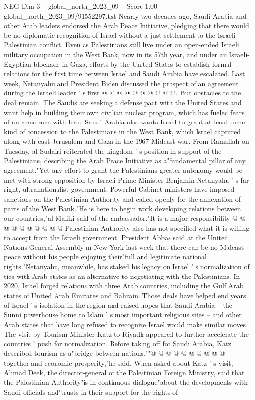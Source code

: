 \begin{textsample}{NEG Dim 3 – global\_north\_2023\_09 – Score 1.00 – global\_north\_2023\_09/91552297.txt}
Nearly two decades ago, Saudi Arabia and other Arab leaders endorsed the Arab Peace Initiative, pledging that there would be no diplomatic recognition of Israel without a just settlement to the Israeli-Palestinian conflict.
Even as Palestinians still live under an open-ended Israeli military occupation in the West Bank, now in its 57th year, and under an Israeli-Egyptian blockade in Gaza, efforts by the United States to establish formal relations for the first time between Israel and Saudi Arabia have escalated.
Last week, Netanyahu and President Biden discussed the prospect of an agreement during the Israeli leader ' s first @ @ @ @ @ @ @ @ @ @.
But obstacles to the deal remain.
The Saudis are seeking a defense pact with the United States and want help in building their own civilian nuclear program, which has fueled fears of an arms race with Iran.
Saudi Arabia also wants Israel to grant at least some kind of concession to the Palestinians in the West Bank, which Israel captured along with east Jerusalem and Gaza in the 1967 Mideast war.
From Ramallah on Tuesday, al-Sudairi reiterated the kingdom ' s position in support of the Palestinians, describing the Arab Peace Initiative as a"fundamental pillar of any agreement."Yet any effort to grant the Palestinians greater autonomy would be met with strong opposition by Israeli Prime Minister Benjamin Netanyahu ' s far-right, ultranationalist government.
Powerful Cabinet ministers have imposed sanctions on the Palestinian Authority and called openly for the annexation of parts of the West Bank."He is here to begin work developing relations between our countries,"al-Maliki said of the ambassador."It is a major responsibility @ @ @ @ @ @ @ @ @ @ Palestinian Authority also has not specified what it is willing to accept from the Israeli government.
President Abbas said at the United Nations General Assembly in New York last week that there can be no Mideast peace without his people enjoying their"full and legitimate national rights."Netanyahu, meanwhile, has staked his legacy on Israel ' s normalization of ties with Arab states as an alternative to negotiating with the Palestinians.
In 2020, Israel forged relations with three Arab countries, including the Gulf Arab states of United Arab Emirates and Bahrain.
Those deals have helped end years of Israel ' s isolation in the region and raised hopes that Saudi Arabia -- the Sunni powerhouse home to Islam ' s most important religious sites -- and other Arab states that have long refused to recognize Israel would make similar moves.
The visit by Tourism Minister Katz to Riyadh appeared to further accelerate the countries ' push for normalization.
Before taking off for Saudi Arabia, Katz described tourism as a"bridge between nations.""@ @ @ @ @ @ @ @ @ @ together and economic prosperity,"he said.
When asked about Katz ' s visit, Ahmad Deek, the director-general of the Palestinian Foreign Ministry, said that the Palestinian Authority"is in continuous dialogue"about the developments with Saudi officials and"trusts in their support for the rights of

\end{textsample}
